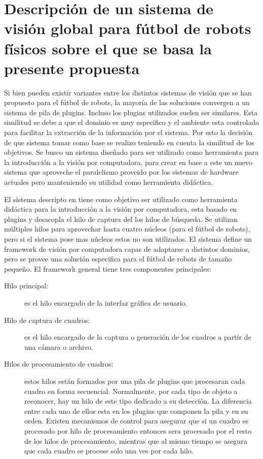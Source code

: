 
\section{Descripción de un sistema de visión global para fútbol de robots
físicos sobre el que se basa la presente propuesta}

Si bien pueden existir variantes entre los distintos sistemas de visión que se
han propuesto para el fútbol de robots, la mayoría de las soluciones convergen a
un sistema de pila de plugins. Incluso los plugins utilizados suelen ser
similares. Esta similitud se debe a que el dominio es muy especifico y el
ambiente esta controlado para facilitar la extracción de la información por el
sistema. Por esto la decisión de que sistema tomar como base se realizo teniendo
en cuenta la similitud de los objetivos. Se busco un sistema diseñado para ser
utilizado como herramienta para la introducción a la visión por computadora,
para crear en base a este un nuevo sistema que aproveche el paralelismo proveido
por los sistemas de hardware actuales pero manteniendo su utilidad como
herramienta didáctica.

El sistema descripto en \cite{torres2014} tiene como objetivo ser utilizado como
herramienta didáctica para la introducción a la visión por computadora, esta
basado en plugins y desacopla el hilo de captura del los hilos de búsqueda. Se
utilizan múltiples hilos para aprovechar hasta cuatro núcleos (para el fútbol de
robots), pero si el sistema pose mas núcleos estos no son utilizados. El sistema
define un framework de visión por computadora capas de adaptarse a distintos
dominios, pero se provee una solución especifica para el fútbol de robots de
tamaño pequeño. El framework general tiene tres componentes principales:

\begin{description}

	\item[Hilo principal:] es el hilo encargado de la interfaz gráfica de
		usuario.
	
	\item[Hilo de captura de cuadros:] es el hilo encargado de la captura o
		generación de los cuadros a partir de una cámara o archivo.

	\item[Hilos de procesamiento de cuadros:] estos hilos están formados por
		una pila de plugins que procesaran cada cuadro en forma
		secuencial. Normalmente, por cada tipo de objeto a reconocer,
		hay un hilo de este tipo dedicado a su detección. La diferencia
		entre cada uno de ellos esta en los plugins que componen la pila
		y en su orden. Existen mecanismos de control para asegurar que
		si un cuadro es procesado por hilo de procesamiento entonces
		sera procesado por el resto de los hilos de procesamiento,
		mientras que al mismo tiempo se asegura que cada cuadro se
		procese solo una ves por cada hilo.

\end{description}

